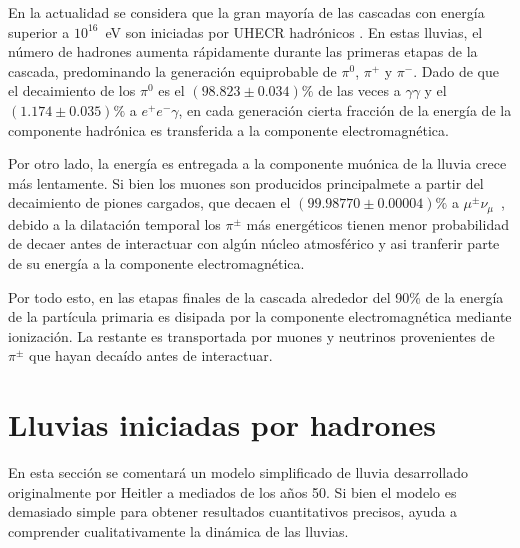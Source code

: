 En la actualidad se considera que la gran mayoría de las cascadas con energía superior a $10^{16}$~eV son iniciadas por UHECR hadrónicos \cite{CONSEGUIR}. 
En estas lluvias, el número de hadrones aumenta rápidamente durante las primeras etapas de la cascada, predominando la generaci\'on equiprobable de $\pi^{0}$, $\pi^{+}$ y $\pi^{-}$.
Dado de que el decaimiento de los $\pi^{0}$ es el $(98.823\pm0.034)\%$ \cite{Agashe:2014kda} de las veces a $\gamma\gamma$ y el $(1.174\pm0.035)\%$ a $e^+e^-\gamma$, en cada generación cierta fracci\'on de la energía de la componente hadr\'onica es transferida a la componente electromagnética.

Por otro lado, la energ\'ia es entregada a la componente muónica de la lluvia crece más lentamente. 
Si bien los muones son producidos principalmete a partir del decaimiento de piones cargados, que decaen el $(99.98770\pm0.00004)\%$ a $\mu^{\pm}\nu_\mu$~\cite{Agashe:2014kda}, debido a la dilatación temporal los $\pi^{\pm}$ más energéticos tienen menor probabilidad de decaer antes de interactuar con alg\'un n\'ucleo atmosf\'erico y asi tranferir parte de su energía a la componente electromagnética.

Por todo esto, en las etapas finales de la cascada alrededor del 90\% de la energía de la partícula primaria es disipada por la componente electromagnética mediante ionización.
La restante es transportada por muones y neutrinos provenientes de $\pi^{\pm}$ que hayan decaído antes de interactuar.

\section{Lluvias iniciadas por hadrones}
En esta sección se comentará un modelo simplificado de lluvia desarrollado originalmente por Heitler \cite{hei54} a mediados de los años 50. Si bien el modelo es demasiado simple para obtener resultados cuantitativos precisos, ayuda a comprender cualitativamente la dinámica de las lluvias.

